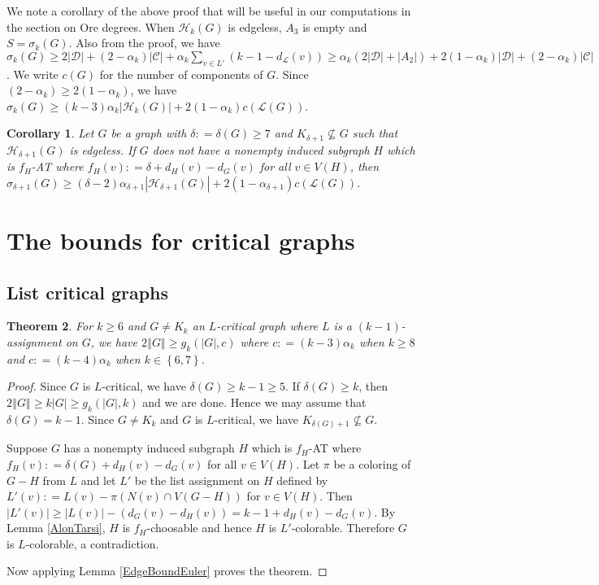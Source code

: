 \documentclass[12pt]{article}
\theoremstyle{plain}
\newtheorem{thm}{Theorem}[section]
\newtheorem{cor}[thm]{Corollary}
\theoremstyle{definition}
\theoremstyle{remark}
\newcommand{\fancy}[1]{\mathcal{#1}}
\newcommand{\CC}{\fancy{C}}
\newcommand{\D}{\fancy{D}}
\renewcommand{\L}{\fancy{L}}
\newcommand{\HH}{\fancy{H}}
\newcommand{\set}[1]{\left\{ #1 \right\}}
\newcommand{\card}[1]{\left|#1\right|}
\newcommand{\size}[1]{\left\Vert#1\right\Vert}
\newcommand{\parens}[1]{\left( #1 \right)}
\newcommand{\DefinedAs}{\mathrel{\mathop:}=}
\def\D{\fancy{D}}
\begin{document}
We note a corollary of the above proof that will be useful in our computations in the section on Ore degrees.  When $\HH_k(G)$ is edgeless, $A_3$ is empty and $S = \sigma_k(G)$.  Also from the proof, we have $\sigma_k(G) \geq 2\card{\D} + (2-\alpha_k)\card{\CC} + \alpha_k\sum_{v \in L'} \parens{k-1 - d_{\L}(v)} \geq  \alpha_k(2\card{\D} + \card{A_2}) + 2(1-\alpha_k)\card{\D} + (2-\alpha_k)\card{\CC}$.   We write $c(G)$ for the number of components of $G$.  Since $(2-\alpha_k) \geq 2(1-\alpha_k)$, we have $\sigma_k(G) \geq (k-3)\alpha_k\card{\HH_k(G)} + 2(1-\alpha_k)c(\L(G))$.

\begin{cor}\label{SigmaCorollary}
Let $G$ be a graph with $\delta \DefinedAs \delta(G) \geq 7$ and $K_{\delta + 1} \not \subseteq G$ such that $\HH_{\delta+1}(G)$ is edgeless. If $G$ does not have a nonempty induced subgraph $H$ which is $f_H$-AT where $f_H(v) \DefinedAs \delta + d_H(v) - d_G(v)$ for all $v \in V(H)$, then $\sigma_{\delta + 1}(G) \geq (\delta-2)\alpha_{\delta + 1}\card{\HH_{\delta+1}(G)} + 2(1-\alpha_{\delta + 1})c(\L(G))$.
\end{cor}

\section{The bounds for critical graphs}
\subsection{List critical graphs}
\begin{thm}\label{EdgeBound}
For $k \geq 6$ and $G \neq K_k$ an $L$-critical graph where $L$ is a $(k-1)$-assignment on $G$, we have  $2\size{G} \geq g_k(\card{G}, c)$ where $c \DefinedAs (k-3)\alpha_k$ when $k \geq 8$ and $c \DefinedAs (k-4)\alpha_k$ when $k \in \set{6,7}$.
\end{thm}
\begin{proof}
Since $G$ is $L$-critical, we have $\delta(G) \geq k - 1 \geq 5$. If $\delta(G) \geq k$, then $2\size{G} \geq k\card{G} \geq g_k(\card{G}, k)$ and we are done.  Hence we may assume that $\delta(G) = k-1$.  Since $G \neq K_k$ and $G$ is $L$-critical, we have $K_{\delta(G) + 1} \not \subseteq G$.  

Suppose $G$ has a nonempty induced subgraph $H$ which is $f_H$-AT where $f_H(v) \DefinedAs \delta(G) + d_H(v) - d_G(v)$ for all $v \in V(H)$.  Let $\pi$ be a coloring of $G-H$ from $L$ and let $L'$ be the list assignment on $H$ defined by $L'(v) \DefinedAs L(v) - \pi(N(v) \cap V(G-H))$ for $v \in V(H)$.  Then $\card{L'(v)} \geq \card{L(v)} - (d_G(v) - d_H(v)) = k - 1 + d_H(v) - d_G(v)$.  By Lemma \ref{AlonTarsi}, $H$ is $f_H$-choosable and hence $H$ is $L'$-colorable.  Therefore $G$ is $L$-colorable, a contradiction.

Now applying Lemma \ref{EdgeBoundEuler} proves the theorem.
\end{proof}
\end{document}
